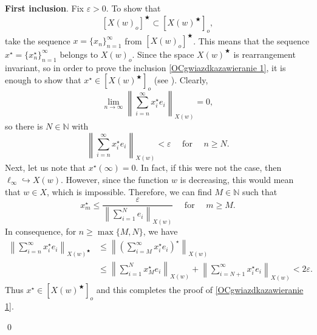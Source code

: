 \documentclass[11pt]{amsart}
\theoremstyle{definition}
\theoremstyle{definition}
\theoremstyle{definition}
\theoremstyle{definition}
\theoremstyle{definition}
\theoremstyle{definition}
\theoremstyle{definition}
\theoremstyle{definition}
\numberwithin{equation}{section}
\numberwithin{equation}{section}
\numberwithin{equation}{section}
\theoremstyle{definition}
\theoremstyle{definition}
\theoremstyle{definition}
\theoremstyle{definition}
\theoremstyle{definition}
\theoremstyle{definition}
\newcommand{\norm}[1]{\left\lVert#1\right\rVert}
\renewenvironment{proof}{\noindent {\bf Proof.}}{\qed}
\begin{document}
\begin{proof}
			{\bf First inclusion}. Fix $\varepsilon > 0$. To show that
			\begin{equation} \label{OCgwiazdkazawieranie 1}
				[ X(w)_o ]^{\bigstar} \subset [ X(w)^{\bigstar} ]_o,
			\end{equation}
			take the sequence $x = \{x_n\}_{n=1}^{\infty}$ from $[ X(w)_o ]^{\bigstar}$.
			This means that the sequence $x^{\star} = \{x^{\star}_n\}_{n=1}^{\infty}$ belongs to $X(w)_o$.
			Since the space $X(w)^{\bigstar}$ is rearrangement invariant, so in order to prove the inclusion \eqref{OCgwiazdkazawieranie 1},
			it is enough to show that $x^{\star} \in [ X(w)^{\bigstar} ]_o$ (see \cite[Theorem~3.6]{KKT22}).
			Clearly,
			\begin{equation*}
				\lim_{n \rightarrow \infty} \norm{ \sum_{i=n}^{\infty} x^{\star}_i e_i }_{X(w)} = 0,
			\end{equation*}
			so there is $N\in\mathbb{N}$ with
			\begin{equation*}
				\norm{ \sum_{i=n}^{\infty} x^{\star}_i e_i }_{X(w)} < \varepsilon \quad \text{ for } \quad n \geqslant N.
			\end{equation*}
			Next, let us note that $x^{\star}(\infty) = 0$. In fact, if this were not the case, then $\ell_\infty \hookrightarrow X(w)$.
			However, since the function $w$ is decreasing, this would mean that $w \in X$, which is impossible.
			Therefore, we can find $M \in \mathbb{N}$ such that
			\begin{equation*}
				x^{\star}_{m} \leqslant \frac{\varepsilon}{\norm{ \sum_{i=1}^N e_i }_{X(w)}} \quad \text{ for } \quad m \geqslant M.
			\end{equation*}
			In consequence, for $n \geqslant \max\{M,N\}$, we have
			\begin{align*}
				\norm{ \sum_{i=n}^{\infty} x^{\star}_i e_i }_{X(w)^{\bigstar}}
					& \leqslant \norm{\left( \sum_{i=M}^{\infty} x^{\star}_i e_i \right)^{\star} }_{X(w)} \\
					& \leqslant\norm{ \sum_{i = 1}^N x^{\star}_{M} e_i }_{X(w)} + \norm{ \sum_{i = N+1}^{\infty} x^{\star}_i e_i }_{X(w)}
					< 2\varepsilon.
			\end{align*}
			Thus $x^{\star} \in [ X(w)^{\bigstar} ]_o$ and this completes the proof of \eqref{OCgwiazdkazawieranie 1}.
			

\end{proof}
\end{document}
